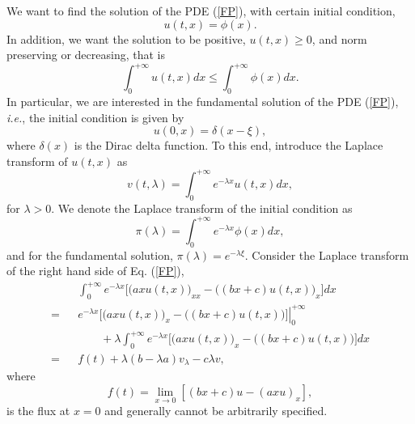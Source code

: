 \documentclass[12pt]{article}
\begin{document}
  We want to find the solution of the PDE (\ref{FP}), with certain initial condition,
  \begin{equation}
    u(t,x) = \phi(x).
    \label{init0}
  \end{equation}
  In addition, we want the solution to be positive, $u(t,x)\ge 0$, and norm preserving or decreasing, that is
  \begin{equation}
    \int_0^{+\infty}u(t,x)dx \le \int_0^{+\infty}\phi(x)dx.
  \end{equation}
  In particular, we are
  interested in the fundamental solution of the PDE (\ref{FP}), {\it i.e.}, the initial condition is given
  by
  \begin{equation}
    u(0,x)=\delta(x-\xi),
    \label{init}
  \end{equation}
  where $\delta(x)$ is the Dirac delta function. To this end, introduce the Laplace transform of $u(t,x)$ as
  \begin{equation}
    v(t,\lambda)=\int_0^{+\infty}e^{-\lambda x}u(t,x)dx,
  \end{equation}
  for $\lambda > 0$. We denote the Laplace transform of the initial condition as
  \begin{equation}
    \pi(\lambda) = \int_0^{+\infty}e^{-\lambda x}\phi(x)dx,
  \end{equation}
  and for the fundamental solution, $\pi(\lambda) = e^{-\lambda \xi}$.
  Consider the Laplace transform of the right hand side of Eq. (\ref{FP}),
  \begin{eqnarray}
      && \int_0^{+\infty} e^{-\lambda x}\bigg[\big(axu(t,x)\big)_{xx}-\big((bx+c)u(t,x)\big)_x\bigg]dx \nonumber\\
    = && \left. e^{-\lambda x}\bigg[\big(axu(t,x)\big)_{x}-\big((bx+c)u(t,x)\big)\bigg]\right|_0^{+\infty}\nonumber\\
      && \quad\quad +\lambda \int_0^{+\infty} e^{-\lambda x}\bigg[\big(axu(t,x)\big)_{x}-\big((bx+c)u(t,x)\big)\bigg]dx \nonumber\\
    = && f(t) + \lambda(b-\lambda a)v_{\lambda} - c\lambda v,
  \end{eqnarray}
  where
  \begin{equation}
    f(t) = \lim_{x\rightarrow 0}\left[(bx+c)u-(axu)_x\right],
  \end{equation}
  is the flux at $x=0$ and generally cannot be arbitrarily specified.
\end{document}

